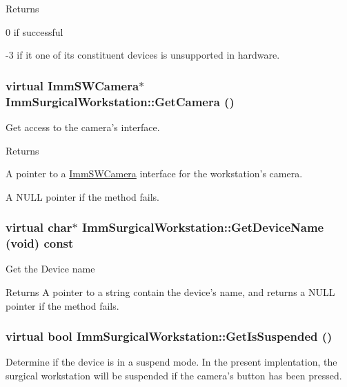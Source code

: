 \begin{DoxyReturn}{Returns}

\end{DoxyReturn}
0 if successful

-\/3 if it one of its constituent devices is unsupported in hardware. \hypertarget{classImmSurgicalWorkstation_a8bf2d3b8f7113f5c8561322a0f2fc9bd}{
\subsubsection[{GetCamera}]{\setlength{\rightskip}{0pt plus 5cm}virtual {\bf ImmSWCamera}$\ast$ ImmSurgicalWorkstation::GetCamera ()}}
\label{classImmSurgicalWorkstation_a8bf2d3b8f7113f5c8561322a0f2fc9bd}
Get access to the camera's interface.

\begin{DoxyReturn}{Returns}

\end{DoxyReturn}
A pointer to a \hyperlink{classImmSWCamera}{ImmSWCamera} interface for the workstation's camera.

A NULL pointer if the method fails. \hypertarget{classImmSurgicalWorkstation_acb5149433694e4e352568ae121ca4def}{
\subsubsection[{GetDeviceName}]{\setlength{\rightskip}{0pt plus 5cm}virtual char$\ast$ ImmSurgicalWorkstation::GetDeviceName (void) const}}
\label{classImmSurgicalWorkstation_acb5149433694e4e352568ae121ca4def}
Get the Device name

\begin{DoxyReturn}{Returns}
A pointer to a string contain the device's name, and returns a NULL pointer if the method fails. 
\end{DoxyReturn}
\hypertarget{classImmSurgicalWorkstation_a822bbdb42bb4745280ba7df7790d0caf}{
\subsubsection[{GetIsSuspended}]{\setlength{\rightskip}{0pt plus 5cm}virtual bool ImmSurgicalWorkstation::GetIsSuspended ()}}
\label{classImmSurgicalWorkstation_a822bbdb42bb4745280ba7df7790d0caf}
Determine if the device is in a suspend mode. In the present implentation, the surgical workstation will be suspended if the camera's button has been pressed.


